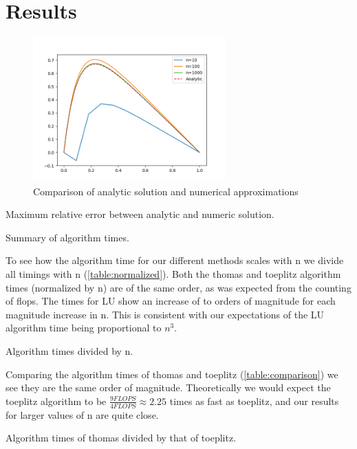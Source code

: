 \section*{Results}

\begin{figure}[H]
  \centering
  \includegraphics[width=0.66\textwidth]{../figures/thomas.png}
  \caption{Comparison of analytic solution and numerical approximations}
  \label{fig:a}
\end{figure}


\begin{table}[htp]
  \centering
  \caption{Maximum relative error between analytic and numeric solution.}
  \label{table:relative_error}
\end{table}


\begin{table}[htp]
  \centering
  \caption{Summary of algorithm times.}
  \label{table:summary}
\end{table}



To see how the algorithm time for our different methods scales with n we divide
all timings with n (\cref{table:normalized}). Both the thomas and toeplitz
algorithm times (normalized by n) are of the same order, as was expected from
the counting of flops. The times for LU show an increase of to orders of magnitude
for each magnitude increase in n. This is consistent with our expectations
of the LU algorithm time being proportional to $n^3$.

\begin{table}[htp]
  \centering
  \caption{Algorithm times divided by n.}
  \label{table:normalized}
\end{table}


Comparing the algorithm times of thomas and toeplitz (\cref{table:comparison})
we see they are the same order of magnitude. Theoretically we would
expect the toeplitz algorithm to be $\frac{9 FLOPS}{4 FLOPS} \approx 2.25$ times as fast as
toeplitz, and our results for larger values of n are quite close.

\begin{table}[htp]
  \centering
  \caption{Algorithm times of thomas divided by that of toeplitz.}
  \label{table:comparison}
\end{table}

